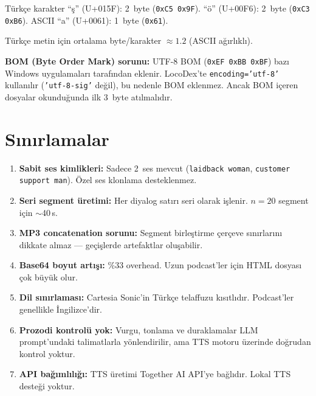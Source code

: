 \begin{ornek}
T\"{u}rk\c{c}e karakter ``\c{s}'' (U+015F): 2~byte (\texttt{0xC5 0x9F}). ``\"{o}'' (U+00F6): 2~byte (\texttt{0xC3 0xB6}). ASCII ``a'' (U+0061): 1~byte (\texttt{0x61}).

T\"{u}rk\c{c}e metin i\c{c}in ortalama byte/karakter $\approx 1.2$ (ASCII a\u{g}{\i}rl{\i}kl{\i}).
\end{ornek}

\textbf{BOM (Byte Order Mark) sorunu:} UTF-8 BOM (\texttt{0xEF 0xBB 0xBF}) baz{\i} Windows uygulamalar{\i} taraf{\i}ndan eklenir. LocoDex'te \texttt{encoding='utf-8'} kullan{\i}l{\i}r (\texttt{'utf-8-sig'} de\u{g}il), bu nedenle BOM eklenmez. Ancak BOM i\c{c}eren dosyalar okundu\u{g}unda ilk 3~byte at{\i}lmal{\i}d{\i}r.


\section{S{\i}n{\i}rlamalar}
\label{sec:podcast_limitations}

\begin{enumerate}
  \item \textbf{Sabit ses kimlikleri:} Sadece 2~ses mevcut (\texttt{laidback woman}, \texttt{customer support man}). \"{O}zel ses klonlama desteklenmez.
  \item \textbf{Seri segment \"{u}retimi:} Her diyalog sat{\i}r{\i} seri olarak i\c{s}lenir. $n = 20$ segment i\c{c}in $\sim$40\,s.
  \item \textbf{MP3 concatenation sorunu:} Segment birle\c{s}tirme \c{c}er\c{c}eve s{\i}n{\i}rlar{\i}n{\i} dikkate almaz --- ge\c{c}i\c{s}lerde artefaktlar olu\c{s}abilir.
  \item \textbf{Base64 boyut art{\i}\c{s}{\i}:} \%33 overhead. Uzun podcast'ler i\c{c}in HTML dosyas{\i} \c{c}ok b\"{u}y\"{u}k olur.
  \item \textbf{Dil s{\i}n{\i}rlamas{\i}:} Cartesia Sonic'in T\"{u}rk\c{c}e telaffuzu k{\i}s{\i}tl{\i}d{\i}r. Podcast'ler genellikle \.{I}ngilizce'dir.
  \item \textbf{Prozodi kontrol\"{u} yok:} Vurgu, tonlama ve duraklamalar LLM prompt'undaki talimatlarla y\"{o}nlendirilir, ama TTS motoru \"{u}zerinde do\u{g}rudan kontrol yoktur.
  \item \textbf{API ba\u{g}{\i}ml{\i}l{\i}\u{g}{\i}:} TTS \"{u}retimi Together AI API'ye ba\u{g}l{\i}d{\i}r. Lokal TTS deste\u{g}i yoktur.
\end{enumerate}


